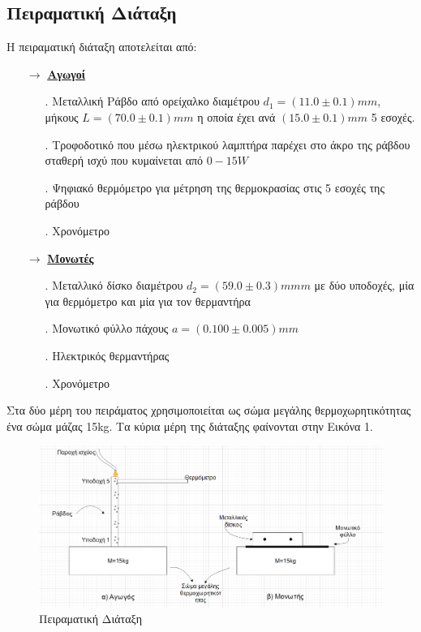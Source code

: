 \documentclass[a4paper]{article}
\begin{document}
\subsection*{Πειραματική Διάταξη}
Η πειραματική διάταξη αποτελείται από: 
\begin{itemize}
\item[$\rightarrow$] \underline{\textbf{Αγωγοί}}
	\begin{itemize}
		\item[.] Μεταλλική Ράβδο από ορείχαλκο διαμέτρου $d_1 = (11.0\pm0.1)mm$, μήκους $L=(70.0\pm0.1)mm$ η οποία έχει ανά 									$(15.0\pm0.1)mm$ 5 εσοχές.
		\item[.] Τροφοδοτικό που μέσω ηλεκτρικού λαμπτήρα παρέχει στο άκρο της ράβδου σταθερή ισχύ που κυμαίνεται από $0-15W$
				\item[.] Ψηφιακό θερμόμετρο για μέτρηση της θερμοκρασίας στις 5 εσοχές της ράβδου
		\item[.] Χρονόμετρο
		\end{itemize}
\item[$\rightarrow$] \underline{\textbf{Μονωτές}} 
	\begin{itemize}
		\item[.] Μεταλλικό δίσκο διαμέτρου $d_2 = (59.0\pm0.3)mmm$ με δύο υποδοχές, μία για θερμόμετρο και μία για τον θερμαντήρα
		\item[.] Μονωτικό φύλλο πάχους $a=(0.100\pm0.005)mm$
		\item[.] Ηλεκτρικός θερμαντήρας
		\item[.] Χρονόμετρο
	\end{itemize}
\end{itemize}
Στα δύο μέρη του πειράματος χρησιμοποιείται ως σώμα μεγάλης θερμοχωρητικότητας ένα σώμα μάζας 15kg. Τα κύρια μέρη της διάταξης φαίνονται στην Εικόνα 1. 
\begin{figure}[h!]
\centering
\caption{ Πειραματική Διάταξη}
\includegraphics[scale=0.285]{setup.png}
\end{figure}
\end{document}
